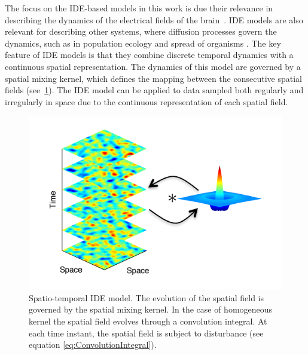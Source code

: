 \documentclass[10pt,twocolumn,twoside]{IEEEtran}
\begin{document}
The focus on the IDE-based models in this work is due their relevance in describing the dynamics of the electrical fields of the brain~\cite{Deco2008,Schiff2008,Freestone2011}. IDE models are also relevant for describing other systems, where diffusion processes govern the dynamics, such as in population ecology and spread of organisms \cite{Kot1992,Kot1996}. The key feature of IDE models is that they combine discrete temporal dynamics with a continuous spatial representation. The dynamics of this model are governed by a spatial mixing kernel, which defines the mapping between the consecutive spatial fields (see~\figurename{\ref{fig:IDEConcept}}). The IDE model can be applied to data sampled both regularly and irregularly in space due to the continuous representation of each spatial field.  

\begin{figure}[ht]
	\centering
		\includegraphics[scale=1]{./Graph/FieldsAndKernel_Arrows.pdf}
	\caption{Spatio-temporal IDE model. The evolution of the spatial field is governed by the spatial mixing kernel. In the case of homogeneous kernel the spatial field evolves through a convolution integral. At each time instant, the spatial field is subject to disturbance (see equation \eqref{eq:ConvolutionIntegral}). }
	\label{fig:IDEConcept}
\end{figure}
\end{document}
